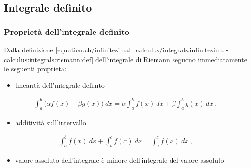 \documentclass[letterpaper,10pt,italian]{jupyterBook}
\begin{document}
\subsection{Integrale definito}
\label{\detokenize{ch/infinitesimal_calculus/integrals:integrale-definito}}\label{\detokenize{ch/infinitesimal_calculus/integrals:infinitesimal-calculus-integrals-def-definite}}

\subsubsection{Proprietà dell’integrale definito}
\label{\detokenize{ch/infinitesimal_calculus/integrals:proprieta-dell-integrale-definito}}\label{\detokenize{ch/infinitesimal_calculus/integrals:infinitesimal-calculus-integrals-def-definite-prop}}\label{\detokenize{ch/infinitesimal_calculus/integrals:infinitesimal-calculus-integrals-def-indefinite}}
\sphinxAtStartPar
Dalla definizione \eqref{equation:ch/infinitesimal_calculus/integrals:infinitesimal-calculus:integrals:riemann:def} dell’integrale di Riemann seguono immediatamente le seguenti proprietà:
\begin{itemize}
\item {} 
\sphinxAtStartPar
linearità dell’integrale definito

\end{itemize}
\begin{equation}\label{equation:ch/infinitesimal_calculus/integrals:infinitesimal-calculus:integrals:prop:linearity}
\begin{split}\int_a^b \big( \alpha f(x) + \beta g(x) \big) \ dx = \alpha \int_a^b f(x) \ dx + \beta \int_a^b g(x) \ dx \ ,\end{split}
\end{equation}\begin{itemize}
\item {} 
\sphinxAtStartPar
additività sull’intervallo

\end{itemize}
\begin{equation}\label{equation:ch/infinitesimal_calculus/integrals:infinitesimal-calculus:integrals:prop:add}
\begin{split}\int_a^b f(x) \ dx + \int_b^c f(x) \ dx = \int_a^c f(x) \ dx \ ,\end{split}
\end{equation}\begin{itemize}
\item {} 
\sphinxAtStartPar
valore assoluto dell’integrale è minore dell’integrale del valore assoluto

\end{itemize}
\end{document}
